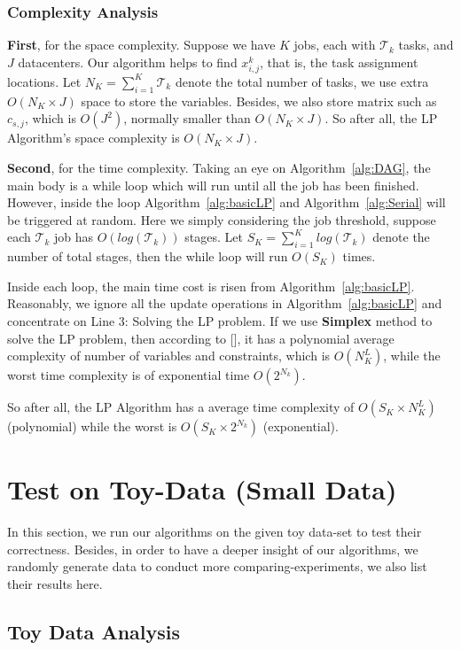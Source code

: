 \documentclass{llncs}
\begin{document}
\subsubsection{Complexity Analysis}
\;

{\bf First}, for the space complexity. Suppose we have $K$ jobs, each with $\mathcal{T}_k$ tasks, and $J$ datacenters. Our algorithm helps to find $x_{i,j}^k$, that is, the task assignment locations. Let $N_K = \sum_{i=1}^K \mathcal{T}_k$ denote the total number of tasks, we use extra $O(N_K \times J)$ space to store the variables. Besides, we also store matrix such as $c_{s,j}$, which is $O(J^2)$, normally smaller than $O(N_K \times J)$. So after all, the LP Algorithm's space complexity is $O(N_K \times J)$.

{\bf Second}, for the time complexity. Taking an eye on Algorithm~\ref{alg:DAG}, the main body is a while loop which will run until all the job has been finished. However, inside the loop Algorithm~\ref{alg:basicLP} and Algorithm~\ref{alg:Serial} will be triggered at random. Here we simply considering the job threshold, suppose each $\mathcal{T}_k$ job has $O(log(\mathcal{T}_k))$ stages. Let $S_K = \sum_{i=1}^K log(\mathcal{T}_k)$ denote the number of total stages, then the while loop will run $O(S_K)$ times.

Inside each loop, the main time cost is risen from Algorithm~\ref{alg:basicLP}. Reasonably, we ignore all the update operations in Algorithm~\ref{alg:basicLP} and concentrate on Line 3: Solving the LP problem. If we use {\bf Simplex} method to solve the LP problem, then according to [], it has a polynomial average complexity of number of variables and constraints, which is $O(N_K^L)$, while the worst time complexity is of exponential time $O(2^{N_k})$.

So after all, the LP Algorithm has a average time complexity of $O(S_K \times N_K^L)$ (polynomial) while the worst is $O(S_K \times 2^{N_k})$ (exponential).

\section{Test on Toy-Data (Small Data)}
In this section, we run our algorithms on the given toy data-set to test their correctness. Besides, in order to have a deeper insight of our algorithms, we randomly generate data to conduct more comparing-experiments, we also list their results here.
\subsection{Toy Data Analysis}
\end{document}
